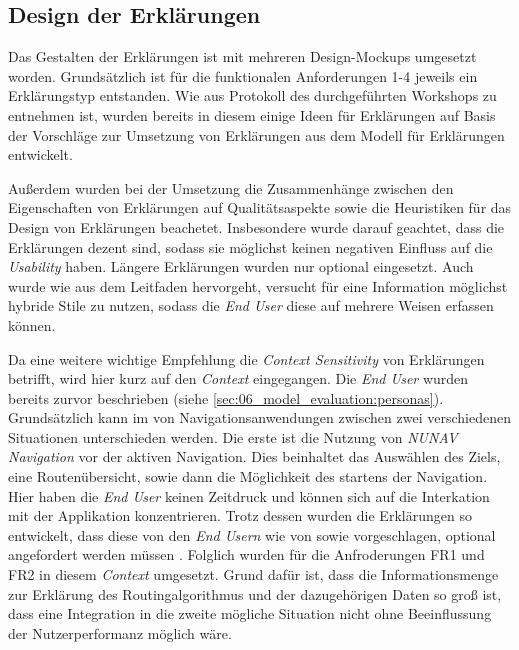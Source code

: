 \subsection{Design der Erklärungen}

Das Gestalten der Erklärungen ist mit mehreren Design-Mockups umgesetzt worden. Grundsätzlich ist für die funktionalen Anforderungen 1-4 jeweils ein Erklärungstyp entstanden. Wie aus Protokoll des durchgeführten Workshops zu entnehmen ist, wurden bereits in diesem einige Ideen für Erklärungen auf Basis der Vorschläge zur Umsetzung von Erklärungen aus dem Modell für Erklärungen entwickelt.

Außerdem wurden bei der Umsetzung die Zusammenhänge zwischen den Eigenschaften von Erklärungen auf Qualitätsaspekte sowie die Heuristiken für das Design von Erklärungen beachetet. Insbesondere wurde darauf geachtet, dass die Erklärungen dezent sind, sodass sie möglichst keinen negativen Einfluss auf die \textit{Usability} haben. Längere Erklärungen wurden nur optional eingesetzt. Auch wurde wie aus dem Leitfaden hervorgeht, versucht für eine Information möglichst hybride Stile zu nutzen, sodass die \textit{End User} diese auf mehrere Weisen erfassen können.

Da eine weitere wichtige Empfehlung die \textit{Context Sensitivity} von Erklärungen betrifft, wird hier kurz auf den \textit{Context} eingegangen. Die \textit{End User} wurden bereits zurvor beschrieben (siehe \autoref{sec:06_model_evaluation:personas}). Grundsätzlich kann im  von Navigationsanwendungen zwischen zwei verschiedenen Situationen unterschieden werden. Die erste ist die Nutzung von \textit{NUNAV Navigation} vor der aktiven Navigation. Dies beinhaltet das Auswählen des Ziels, eine Routenübersicht, sowie dann die Möglichkeit des startens der Navigation. Hier haben die \textit{End User} keinen Zeitdruck und können sich auf die Interkation mit der Applikation konzentrieren. Trotz dessen wurden die Erklärungen so entwickelt, dass diese von den \textit{End Usern} wie von \citeauthor{chazette_end-users_nodate} sowie \citeauthor{wang_integration_2020} vorgeschlagen, optional angefordert werden müssen \cite{chazette_end-users_nodate,wang_integration_2020}. Folglich wurden für die Anfroderungen FR1 und FR2 in diesem \textit{Context} umgesetzt. Grund dafür ist, dass die Informationsmenge zur Erklärung des Routingalgorithmus und der dazugehörigen Daten so groß ist, dass eine Integration in die zweite mögliche Situation nicht ohne Beeinflussung der Nutzerperformanz möglich wäre.

